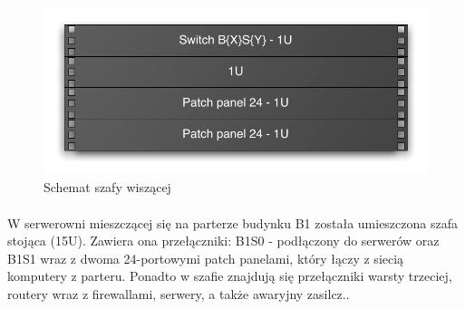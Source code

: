 \begin{figure}[H]
  \begin{center}
    \includegraphics[width=\textwidth]{img/s/szafa-mala.pdf}
    \caption{Schemat szafy wiszącej}
  \end{center}
\end{figure}

\paragraph{}
W serwerowni mieszczącej się na parterze budynku B1 została umieszczona szafa stojąca (15U).
Zawiera ona przełączniki: B1S0 - podłączony do serwerów oraz B1S1 wraz z dwoma 24-portowymi patch panelami, który łączy z siecią komputery z parteru.
Ponadto w szafie znajdują się przełączniki warsty trzeciej, routery wraz z firewallami, serwery, a także awaryjny zasilcz..


